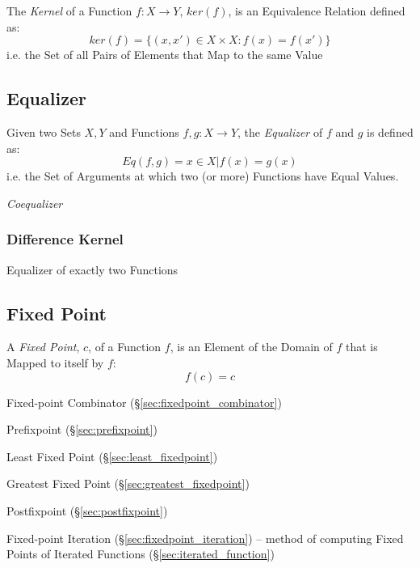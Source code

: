 The \emph{Kernel} of a Function $f : X \rightarrow Y$, $ker(f)$, is an
Equivalence Relation defined as:
\[
  ker(f) = \{ (x,x') \in X \times X : f(x) = f(x') \}
\]
i.e. the Set of all Pairs of Elements that Map to the same Value



\subsection{Equalizer}\label{sec:function_equalizer}

Given two Sets $X,Y$ and Functions $f,g : X \rightarrow Y$, the
\emph{Equalizer} of $f$ and $g$ is defined as:
\[
  Eq(f,g) = { x \in X | f(x) = g(x) }
\]
i.e. the Set of Arguments at which two (or more) Functions have Equal
Values.


\emph{Coequalizer}



\subsubsection{Difference Kernel}\label{sec:difference_equalizer}

Equalizer of exactly two Functions



\subsection{Fixed Point}\label{sec:fixed_point}

A \emph{Fixed Point}, $c$, of a Function $f$, is an Element of the
Domain of $f$ that is Mapped to itself by $f$:
\[
  f(c) = c
\]

Fixed-point Combinator (\S\ref{sec:fixedpoint_combinator})

Prefixpoint (\S\ref{sec:prefixpoint})

Least Fixed Point (\S\ref{sec:least_fixedpoint})

Greatest Fixed Point (\S\ref{sec:greatest_fixedpoint})

Postfixpoint (\S\ref{sec:postfixpoint})

\fist Fixed-point Iteration (\S\ref{sec:fixedpoint_iteration}) -- method of
computing Fixed Points of Iterated Functions (\S\ref{sec:iterated_function})



